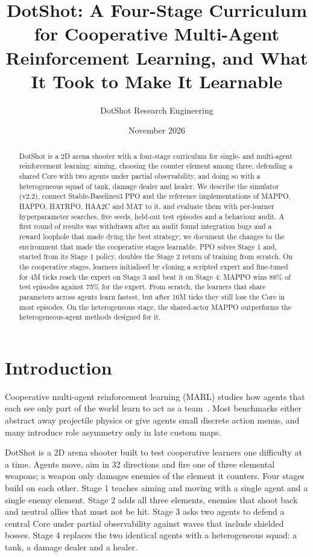 \documentclass[11pt]{article}
\title{DotShot: A Four-Stage Curriculum for Cooperative Multi-Agent Reinforcement Learning, and What It Took to Make It Learnable}
\author{DotShot Research Engineering}
\date{November 2026}
\begin{document}
\maketitle

\begin{abstract}
DotShot is a 2D arena shooter with a four-stage curriculum for single- and multi-agent reinforcement learning: aiming, choosing the counter element among three, defending a shared Core with two agents under partial observability, and doing so with a heterogeneous squad of tank, damage dealer and healer. We describe the simulator (v2.2), connect Stable-Baselines3 PPO and the reference implementations of MAPPO, HAPPO, HATRPO, HAA2C and MAT to it, and evaluate them with per-learner hyperparameter searches, five seeds, held-out test episodes and a behaviour audit. A first round of results was withdrawn after an audit found integration bugs and a reward loophole that made dying the best strategy; we document the changes to the environment that made the cooperative stages learnable. PPO solves Stage 1 and, started from its Stage 1 policy, doubles the Stage 2 return of training from scratch. On the cooperative stages, learners initialised by cloning a scripted expert and fine-tuned for 4M ticks reach the expert on Stage 3 and beat it on Stage 4: MAPPO wins 88\% of test episodes against 75\% for the expert. From scratch, the learners that share parameters across agents learn fastest, but after 16M ticks they still lose the Core in most episodes. On the heterogeneous stage, the shared-actor MAPPO outperforms the heterogeneous-agent methods designed for it.
\end{abstract}

\section{Introduction}
\label{sec:intro}

Cooperative multi-agent reinforcement learning (MARL) studies how agents that each see only part of the world learn to act as a team~\cite{oliehoek2016decpomdp,albrecht2024marl}. Most benchmarks either abstract away projectile physics or give agents small discrete action menus, and many introduce role asymmetry only in late custom maps.

DotShot is a 2D arena shooter built to test cooperative learners one difficulty at a time. Agents move, aim in 32 directions and fire one of three elemental weapons; a weapon only damages enemies of the element it counters. Four stages build on each other. Stage 1 teaches aiming and moving with a single agent and a single enemy element. Stage 2 adds all three elements, enemies that shoot back and neutral allies that must not be hit. Stage 3 asks two agents to defend a central Core under partial observability against waves that include shielded bosses. Stage 4 replaces the two identical agents with a heterogeneous squad: a tank, a damage dealer and a healer.
\end{document}
